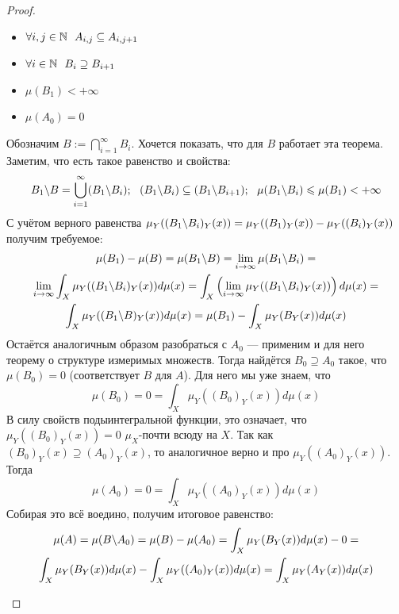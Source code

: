 \begin{proof}
\begin{enumerate}
\begin{itemize}
			\item $\forall i, j \in \mathbb{N}\ \ A_{i, j} \subseteq A_{i, j + 1}$
			
			\item $\forall i \in \mathbb{N}\ \ B_i \supseteq B_{i + 1}$
			
			\item $\mu(B_1) < +\infty$
			
			\item $\mu(A_0) = 0$
		\end{itemize}
		Обозначим $B := \bigcap_{i = 1}^\infty B_i$. Хочется показать, что для $B$ работает эта теорема. Заметим, что есть такое равенство и свойства:
		\[
			B_1 \backslash B = \bigcup_{i = 1}^\infty (B_1 \backslash B_i);\ \ (B_1 \backslash B_i) \subseteq (B_1 \backslash B_{i + 1});\ \ \mu(B_1 \backslash B_i) \leqslant \mu(B_1) < +\infty
		\]
		С учётом верного равенства $\mu_Y((B_1 \backslash B_i)_Y(x)) = \mu_Y((B_1)_Y(x)) - \mu_Y((B_i)_Y(x))$ получим требуемое:
		\begin{multline*}
			\mu(B_1) - \mu(B) = \mu(B_1 \backslash B) = \lim_{i \to \infty} \mu(B_1 \backslash B_i) =
			\\
			\lim_{i \to \infty} \int_X \mu_Y((B_1 \backslash B_i)_Y(x))d\mu(x) = \int_X \left(\lim_{i \to \infty} \mu_Y((B_1 \backslash B_i)_Y(x))\right)d\mu(x) =
			\\
			\int_X \mu_Y((B_1 \backslash B)_Y(x))d\mu(x) = \mu(B_1) - \int_X \mu_Y(B_Y(x))d\mu(x)
		\end{multline*}
		Остаётся аналогичным образом разобраться с $A_0$ --- применим и для него теорему о структуре измеримых множеств. Тогда найдётся $B_0 \supseteq A_0$ такое, что $\mu(B_0) = 0$ (соответствует $B$ для $A$). Для него мы уже знаем, что
		\[
			\mu(B_0) = 0 = \int_X \mu_Y((B_0)_Y(x))d\mu(x)
		\]
		В силу свойств подыинтегральной функции, это означает, что $\mu_Y((B_0)_Y(x)) = 0$ $\mu_X$-почти всюду на $X$. Так как $(B_0)_Y(x) \supseteq (A_0)_Y(x)$, то аналогичное верно и про $\mu_Y((A_0)_Y(x))$. Тогда
		\[
			\mu(A_0) = 0 = \int_X \mu_Y((A_0)_Y(x))d\mu(x)
		\]
		Собирая это всё воедино, получим итоговое равенство:
		\begin{multline*}
			\mu(A) = \mu(B \backslash A_0) = \mu(B) - \mu(A_0) = \int_X \mu_Y(B_Y(x))d\mu(x) - 0 =
			\\
			\int_X \mu_Y(B_Y(x))d\mu(x) - \int_X \mu_Y((A_0)_Y(x))d\mu(x) = \int_X \mu_Y(A_Y(x))d\mu(x)
		\end{multline*}
		

\end{enumerate}
\end{proof}
